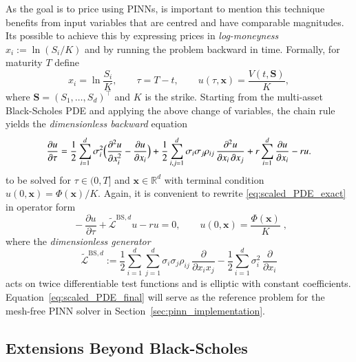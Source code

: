 \documentclass[12pt]{report} %
\theoremstyle{plain}           %
\theoremstyle{definition}      %
\theoremstyle{remark}          %
\begin{document}
As the goal is to price using PINNs, is important to mention this technique benefits 
from input variables that are centred and have comparable magnitudes.  
Its possible to achieve this by expressing prices in \emph{log-moneyness}
$x_i:=\ln(S_i/K)$ and by running the problem backward in time.
Formally, for maturity \(T\) define
\[
x_i=\ln\frac{S_i}{K},\qquad
\tau=T-t,\qquad
u(\tau,\mathbf{x})=\frac{V(t,\mathbf{S})}{K},
\]
where \(\mathbf{S}=(S_1,\dots,S_d)^{\!\top}\) and
\(K\) is the strike. Starting from the multi-asset Black-Scholes PDE and applying 
the above change of variables, the chain rule yields the
 \emph{dimensionless backward} equation  
\begin{equation}
  \frac{\partial u}{\partial \tau} =
    \frac12\sum_{i=1}^{d}\sigma_i^{2}
        \Bigl(
            \frac{\partial^{2}u}{\partial x_i^{2}}
          - \frac{\partial u}{\partial x_i}
        \Bigr)
  + \frac12\sum_{i,j=1}^{d}\sigma_i\sigma_j\rho_{ij}
        \,\frac{\partial^{2}u}{\partial x_i\,\partial x_j}
  + r\sum_{i=1}^{d}\frac{\partial u}{\partial x_i}
  - ru.
  \label{eq:scaled_PDE_exact}
\end{equation}
to be solved for
\(\tau\in(0,T]\) and \(\mathbf{x}\in\mathbb{R}^{d}\) with terminal
condition \(u(0,\mathbf{x})=\Phi(\mathbf{x})/K\). Again, it is convenient to rewrite \eqref{eq:scaled_PDE_exact} in operator
form
\[
\;
-\frac{\partial u}{\partial \tau} + 
\widetilde{\mathcal{L}}^{\mathrm{BS},d}u - ru = 0,
\qquad
u(0,\mathbf{x})=\frac{\Phi(\mathbf{x})}{K}
\;,
\]
where the \emph{dimensionless generator}
\begin{equation}\label{eq:L_tilde_BS}
  \;
  \widetilde{\mathcal{L}}^{\mathrm{BS},d}
  := \frac{1}{2}\sum_{i=1}^{d}\sum_{j=1}^{d}
       \sigma_i\sigma_j\rho_{ij}\,
       \frac{\partial}{\partial x_i x_j}
     - \frac{1}{2}\sum_{i=1}^{d}\sigma_i^{2}\,
       \frac{\partial}{\partial x_i}
  \;
\end{equation}
acts on twice differentiable test functions
and is elliptic with constant coefficients.
Equation~\eqref{eq:scaled_PDE_final} will serve as the reference
problem for the mesh-free PINN solver in
Section~\ref{sec:pinn_implementation}.

\subsection{Extensions Beyond Black-Scholes}\label{sec:extensions}
\end{document}
